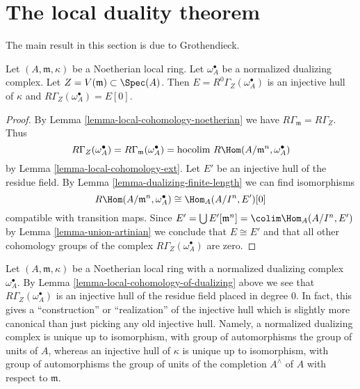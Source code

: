 \section{The local duality theorem}
\label{section-local-duality}

\noindent
The main result in this section is due to Grothendieck.

\begin{lemma}
\label{lemma-local-cohomology-of-dualizing}
Let $(A, \mathfrak m, \kappa)$ be a Noetherian local ring.
Let $\omega_A^\bullet$ be a normalized dualizing complex.
Let $Z = V(\mathfrak m) \subset \Spec(A)$.
Then $E = R^0\Gamma_Z(\omega_A^\bullet)$ is an injective hull of
$\kappa$ and $R\Gamma_Z(\omega_A^\bullet) = E[0]$.
\end{lemma}

\begin{proof}
By Lemma \ref{lemma-local-cohomology-noetherian} we have
$R\Gamma_{\mathfrak m} = R\Gamma_Z$. Thus
$$
R\Gamma_Z(\omega_A^\bullet) =
R\Gamma_{\mathfrak m}(\omega_A^\bullet) =
\text{hocolim}\ R\Hom(A/\mathfrak m^n, \omega_A^\bullet)
$$
by Lemma \ref{lemma-local-cohomology-ext}. Let $E'$ be an injective
hull of the residue field.
By Lemma \ref{lemma-dualizing-finite-length}
we can find isomorphisms
$$
R\Hom(A/\mathfrak m^n, \omega_A^\bullet) \cong \Hom_A(A/I^n, E')[0]
$$
compatible with transition maps. Since
$E' = \bigcup E'[\mathfrak m^n] = \colim \Hom_A(A/I^n, E')$
by Lemma \ref{lemma-union-artinian}
we conclude that $E \cong E'$ and that all other cohomology
groups of the complex $R\Gamma_Z(\omega_A^\bullet)$ are zero.
\end{proof}

\begin{remark}
\label{remark-specific-injective-hull}
Let $(A, \mathfrak m, \kappa)$ be a Noetherian local ring
with a normalized dualizing complex $\omega_A^\bullet$.
By Lemma \ref{lemma-local-cohomology-of-dualizing}
above we see that $R\Gamma_Z(\omega_A^\bullet)$
is an injective hull of the residue field placed in degree $0$.
In fact, this gives a ``construction'' or ``realization''
of the injective hull which is slightly more canonical than
just picking any old injective hull. Namely, a normalized
dualizing complex is unique up to isomorphism, with group
of automorphisms the group of units of $A$, whereas an
injective hull of $\kappa$ is unique up to isomorphism, with
group of automorphisms the group of units of the completion
$A^\wedge$ of $A$ with respect to $\mathfrak m$.
\end{remark}

